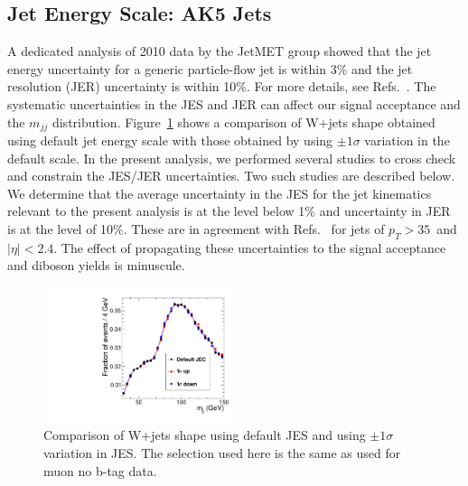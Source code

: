 \subsection{Jet Energy Scale: AK5 Jets}
\label{sec:topw}
A dedicated analysis of 2010 data by the JetMET group showed that the jet energy
uncertainty for a generic particle-flow jet is within 3\% and the jet resolution
(JER) uncertainty is within 10\%.  For more details, see
Refs.~\cite{jetsyst,jetsyst2}.  The systematic uncertainties in the
JES and JER can affect our signal acceptance and the $m_{jj}$ distribution.
Figure~\ref{fig:ECComparison} shows a comparison of W+jets shape 
obtained using default jet energy scale with those obtained by using 
$\pm 1\sigma$ variation in the default scale.
In the present analysis, we performed several studies to cross check 
and constrain the JES/JER uncertainties. Two such studies are described 
below. We determine that the average uncertainty in the JES for the 
jet kinematics relevant to the present analysis is at the level below 1\% 
and uncertainty in JER is at the level of 10\%. These are in agreement 
with Refs.~\cite{jetsyst,jetsyst2} for jets of $p_T > 35$~\gev and 
$|\eta|<2.4$. The effect of propagating these uncertainties to the 
signal acceptance and diboson yields is minuscule. 
\begin{figure}[h!] {\centering
    \includegraphics[width=0.5\textwidth]{figs/JECComparison.pdf}
    \caption{Comparison of W+jets shape using default JES and 
    using $\pm 1\sigma$ variation in JES. The selection used here 
    is the same as used for muon no b-tag data.}
    \label{fig:ECComparison}}
\end{figure}
%

